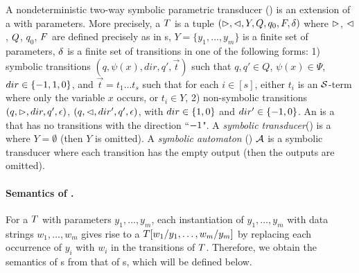 \begin{definition}
A nondeterministic two-way symbolic parametric transducer (\SSPT) is an extension of a \SST{} with parameters. More precisely,  a \SSPT{} $T$ is a tuple
$(\vartriangleright, \vartriangleleft, Y, Q, q_0, F, \delta)$ where
%
$\vartriangleright$, $\vartriangleleft$, $Q$, $q_0$, $F$ are defined precisely as in \FFA{}s, 
%
$Y=\{y_1,\ldots, y_m\}$ is a finite set of parameters, 
%
$\delta$ is a finite set of transitions in one of the following forms: 
1) symbolic transitions $(q, \psi(x), dir, q', \vec{t})$ such that $q,q' \in Q$, $\psi(x) \in \Psi$, $dir \in \{-1, 1, 0\}$, 
and $\vec{t} = t_1 \ldots t_s$ such that for each $i \in [s]$, either $t_i$ is an $\mathcal{S}$-term where only the variable $x$ occurs, or $t_i \in Y$,
%
2) non-symbolic transitions $(q, \vartriangleright, dir, q', \epsilon)$, $(q, \vartriangleleft, dir', q', \epsilon)$, with $dir \in \{1, 0\}$ and $dir' \in \{-1, 0\}$. 
An \SPT{} is a  \SSPT{} that has no transitions with the direction ``$-1$". 
A \emph{symbolic transducer}(\SST) is a \SSPT{} where $Y = \emptyset$ (then $Y$ is omitted).  A \emph{symbolic automaton} (\SSA) $\mathcal{A}$ is a symbolic transducer where each transition has the  empty output (then the outputs are omitted).
\end{definition}

\paragraph{Semantics of \SSPT{}.}
For a \SSPT{} $T$ with parameters $y_1,\ldots, y_m$,  each instantiation of $y_1,\ldots, y_m$ with data strings 
$w_1,\ldots, w_m$ gives rise to a \SST{} $T[w_1/y_1,\ldots, w_m/y_m]$ by replacing each occurrence of $y_i$ with $w_i$ in the transitions of $T$. 
Therefore, we obtain the semantics of \SSPT{}s from that of \SST{}s, which will be defined below. 

